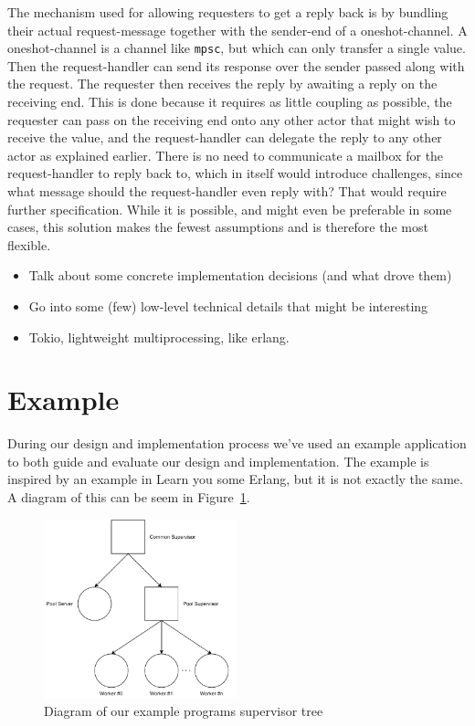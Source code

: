 \documentclass[a4paper]{article}
\newcommand\figref[1]{Figure~\ref{#1}}
\begin{document}
\begin{itemize}
  The mechanism used for allowing requesters to get a reply back is by bundling
  their actual request-message together with the sender-end of a
  oneshot-channel. A oneshot-channel is a channel like \texttt{mpsc}, but which
  can only transfer a single value. Then the request-handler can send its
  response over the sender passed along with the request. The requester then
  receives the reply by awaiting a reply on the receiving end. This is done because
  it requires as little coupling as possible, the requester can pass on the
  receiving end onto any other actor that might wish to receive the value, and
  the request-handler can delegate the reply to any other actor as explained
  earlier. There is no need to communicate a mailbox for the request-handler to
  reply back to, which in itself would introduce challenges, since what message
  should the request-handler even reply with? That would require further
  specification. While it is possible, and might even be preferable in some
  cases, this solution makes the fewest assumptions and is therefore the most
  flexible. %

\end{itemize}


\begin{itemize}
\item Talk about some concrete implementation decisions (and what drove them)
\item Go into some (few) low-level technical details that might be interesting
\item Tokio, lightweight multiprocessing, like erlang.
\end{itemize}

\newpage
\section{Example}
During our design and implementation process we've used an example application
to both guide and evaluate our design and implementation. The example is
inspired by an example in Learn you some Erlang\cite{LYSE}, but it is not
exactly the same. A diagram of this can be seem in \figref{fig:example_diagram}.

\begin{figure}[h!]
  \centering
  \includegraphics[width=0.5\textwidth]{./resources/PoolDiagram.pdf}
  \caption{Diagram of our example programs supervisor tree}
  \label{fig:example_diagram}
\end{figure}
\end{document}
